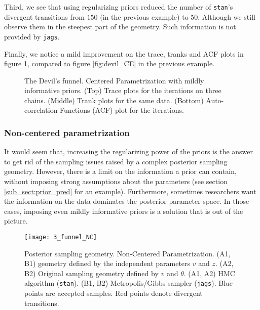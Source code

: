 Third, we see that using regularizing priors reduced the number of \texttt{stan}'s divergent transitions from $150$ (in the previous example) to $50$. Although we still observe them in the steepest part of the geometry. Such information is not provided by \texttt{jags}.

Finally, we notice a mild improvement on the trace, tranks and ACF plots in figure \ref{fig:devil_prior}, compared to figure \ref{fig:devil_CE} in the previous example.
%
\begin{figure}[h] 
	\centering
	\begin{subfigure}
		\texttt{[image: 2\_trace\_CE\_priors]}
	\end{subfigure}
	\begin{subfigure}
		\texttt{[image: 2\_trank\_CE\_priors]}
	\end{subfigure}
	\begin{subfigure}
		\texttt{[image: 2\_acf\_CE\_priors]}
	\end{subfigure}
	\caption[The Devil's funnel. Centered Parametrization with prior information.]%
	{The Devil's funnel. Centered Parametrization with mildly informative priors. (Top) Trace plots for the iterations on three chains. (Middle) Trank plots for the same data. (Bottom) Auto-correlation Functions (ACF) plot for the iterations.}
	\label{fig:devil_prior}
\end{figure}


\subsubsection{Non-centered parametrization}

It would seem that, increasing the regularizing power of the priors is the answer to get rid of the sampling issues raised by a complex posterior sampling geometry. However, there is a limit on the information a prior can contain, without imposing strong assumptions about the parameters (see section \ref{sub_sect:prior_pred} for an example). Furthermore, sometimes researchers want the information on the data dominates the posterior parameter space. In those cases, imposing even mildly informative priors is a solution that is out of the picture.
%
\begin{figure}[h]
	\centering
	\texttt{[image: 3\_funnel\_NC]}
	\caption[Posterior sampling geometry. Non-Centered Parametrization.]%
	{Posterior sampling geometry. Non-Centered Parametrization. (A1, B1) geometry defined by the independent parameters $v$ and $z$. (A2, B2) Original sampling geometry defined by $v$ and $\theta$. (A1, A2) HMC algorithm (\texttt{stan}). (B1, B2) Metropolis/Gibbs sampler (\texttt{jags}). Blue points are accepted samples. Red points denote divergent transitions.}
	\label{fig:devil_NC_geom}
\end{figure}

